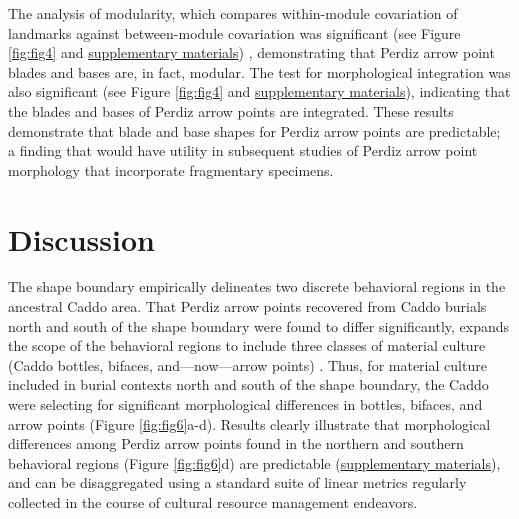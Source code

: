 \documentclass[smallextended]{svjour3}       %
\begin{document}
The analysis of modularity, which compares within-module covariation of
landmarks against between-module covariation was significant (see Figure
\ref{fig:fig4} and
\href{https://seldenlab.github.io/perdiz3/}{supplementary materials})
\cite{RN10874,RN5170}, demonstrating that Perdiz arrow point blades and
bases are, in fact, modular. The test for morphological integration was
also significant (see Figure \ref{fig:fig4} and
\href{https://seldenlab.github.io/perdiz3/}{supplementary materials}),
indicating that the blades and bases of Perdiz arrow points are
integrated. These results demonstrate that blade and base shapes for
Perdiz arrow points are predictable; a finding that would have utility
in subsequent studies of Perdiz arrow point morphology that incorporate
fragmentary specimens.

\hypertarget{discussion}{%
\section{Discussion}\label{discussion}}

The shape boundary empirically delineates two discrete behavioral
regions in the ancestral Caddo area. That Perdiz arrow points recovered
from Caddo burials north and south of the shape boundary were found to
differ significantly, expands the scope of the behavioral regions to
include three classes of material culture (Caddo bottles, bifaces,
and---now---arrow points)
\cite{RN8074,RN7927,RN8370,RN8312,RN8322,RN8158,RN11097}. Thus, for
material culture included in burial contexts north and south of the
shape boundary, the Caddo were selecting for significant morphological
differences in bottles, bifaces, and arrow points (Figure
\ref{fig:fig6}a-d). Results clearly illustrate that morphological
differences among Perdiz arrow points found in the northern and southern
behavioral regions (Figure \ref{fig:fig6}d) are predictable
(\href{https://seldenlab.github.io/perdiz3/}{supplementary materials}),
and can be disaggregated using a standard suite of linear metrics
regularly collected in the course of cultural resource management
endeavors.
\end{document}
